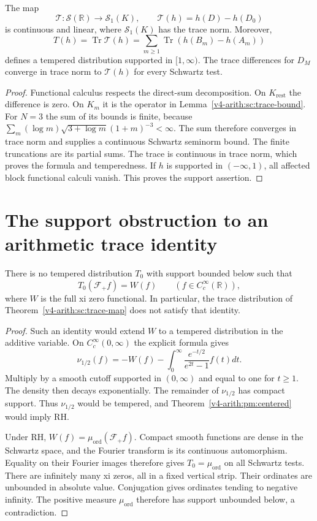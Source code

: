 \begin{theorem}
\label{v4-arith:sc:trace-map}
The map
\[
 \mathcal T:\mathscr S(\mathbb R)\longrightarrow\mathcal S_1(K),
 \qquad \mathcal T(h)=h(D)-h(D_0)
\]
is continuous and linear, where $\mathcal S_1(K)$ has the trace norm.
Moreover,
\[
 T(h)=\operatorname{Tr}\mathcal T(h)
   =\sum_{m\ge1}\operatorname{Tr}(h(B_m)-h(A_m))
\]
defines a tempered distribution supported in $[1,\infty)$.
The trace differences for $D_M$ converge in trace norm to
$\mathcal T(h)$ for every Schwartz test.
\end{theorem}
\begin{proof}
Functional calculus respects the direct-sum decomposition.
On $K_{\mathrm{rest}}$ the difference is zero. On $K_m$ it is the
operator in Lemma~\ref{v4-arith:sc:trace-bound}.
For $N=3$ the sum of its bounds is finite, because
$\sum_m(\log m)\sqrt{3+\log m}(1+m)^{-3}<\infty$.
The sum therefore converges in trace norm and supplies a continuous
Schwartz seminorm bound. The finite truncations are its partial sums.
The trace is continuous in trace norm, which proves the formula
and temperedness. If $h$ is supported in $(-\infty,1)$, all affected
block functional calculi vanish. This proves the support assertion.
\end{proof}

\section{The support obstruction to an arithmetic trace identity}

\begin{theorem}
\label{v4-arith:sc:support-obstruction}
There is no tempered distribution $T_0$ with support bounded below
such that
\[
 T_0(\mathcal F_+f)=W(f)\qquad(f\in C_c^\infty(\mathbb R)),
\]
where $W$ is the full xi zero functional.
In particular, the trace distribution of
Theorem~\ref{v4-arith:sc:trace-map} does not satisfy that identity.
\end{theorem}
\begin{proof}
Such an identity would extend $W$ to a tempered distribution in the
additive variable. On $C_c^\infty(0,\infty)$ the explicit formula gives
\[
 \nu_{1/2}(f)=-W(f)-\int_0^\infty
                \frac{e^{-t/2}}{e^{2t}-1}f(t)dt.
\]
Multiply by a smooth cutoff supported in $(0,\infty)$ and equal
to one for $t\ge1$. The density then decays exponentially.
The remainder of $\nu_{1/2}$ has compact support. Thus
$\nu_{1/2}$ would be tempered, and
Theorem~\ref{v4-arith:pm:centered} would imply RH.

Under RH, $W(f)=\mu_{\mathrm{ord}}(\mathcal F_+f)$.
Compact smooth functions are dense in the Schwartz space, and the
Fourier transform is its continuous automorphism. Equality on their
Fourier images therefore gives $T_0=\mu_{\mathrm{ord}}$ on all Schwartz tests.
There are infinitely many xi zeros, all in a fixed vertical strip.
Their ordinates are unbounded in absolute value. Conjugation gives
ordinates tending to negative infinity. The positive measure
$\mu_{\mathrm{ord}}$ therefore has support unbounded below, a contradiction.
\end{proof}

